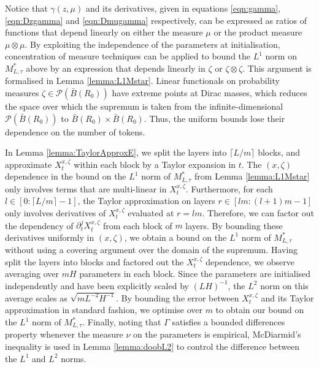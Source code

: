 \documentclass{article}
\begin{document}
Notice that $\gamma(z,\mu)$ and its derivatives, given in equations \eqref{eqn:gamma}, \eqref{eqn:Dzgamma} and \eqref{eqn:Dmugamma} respectively, can be expressed as ratios of functions that depend linearly on either the measure $\mu$ or the product measure $\mu\otimes \mu$. By exploiting the independence of the parameters at initialisation, concentration of measure techniques can be applied to bound the $L^1$ norm on $M^*_{L,\tau}$ above by an expression that depends linearly in $\zeta$ or $\zeta\otimes \zeta$. This argument is formalised in Lemma \ref{lemma:L1Mstar}. Linear functionals on probability measures $\zeta\in \mathcal P(\bar B(R_0))$ have extreme points at Dirac masses, which reduces the space over which the supremum is taken from the infinite-dimensional $\mathcal P (\bar B(R_0))$ to $\bar B(R_0)\times \bar B(R_0) $. Thus, the uniform bounds lose their dependence on the number of tokens.
    
In Lemma \ref{lemma:TaylorApproxE}, we split the layers into $\lceil L/m\rceil$ blocks, and approximate $X^{x,\zeta}_t$ within each block by a Taylor expansion in $t$. The $(x,\zeta)$ dependence in the bound on the $L^1$ norm of $M^*_{L,\tau}$ from Lemma \ref{lemma:L1Mstar} only involves terms that are multi-linear in $X^{x,\zeta}_t$. Furthermore, for each $l\in[0:\lceil L/m\rceil-1]$, the Taylor approximation on layers $r\in[lm:(l+1)m-1]$ only involves derivatives of $X^{x,\zeta}_t$ evaluated at $r=lm$. Therefore, we can factor out the dependency of $\partial^j_tX^{x,\zeta}_{t}$ from each block of $m$ layers. By bounding these derivatives uniformly in $(x,\zeta)$, we obtain a bound on the $L^1$ norm of $M^*_{L,\tau}$ without using a covering argument over the domain of the supremum. Having split the layers into blocks and factored out the $X_t^{x,\zeta}$ dependence, we observe averaging over $mH$ parameters in each block. Since the parameters are initialised independently and have been explicitly scaled by $(LH)^{-1}$, the $L^2$ norm on this average scales as $\sqrt{mL^{-2}H^{-1}}$. By bounding the error between $X^{x,\zeta}_t$ and its Taylor approximation in standard fashion, we optimise over $m$ to obtain our bound on the $L^1$ norm of $M^*_{L,\tau}$. Finally, noting that $\Gamma$ satisfies a bounded differences property whenever the measure $\nu$ on the parameters is empirical, McDiarmid's inequality is used in Lemma \ref{lemma:doobL2} to control the difference between the $L^1$ and $L^2$ norms.
\end{document}
